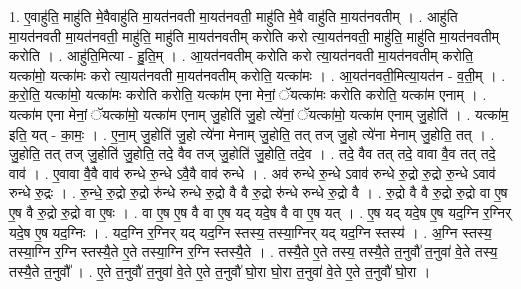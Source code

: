 \documentclass[17pt]{extarticle}
\begin{document}
1. ए॒वाहु॑ति॒ माहु॑ति मे॒वैवाहु॑ति मा॒यत॑नवती मा॒यत॑नवती॒ माहु॑ति मे॒वै वाहु॑ति मा॒यत॑नवतीम् । . आहु॑ति मा॒यत॑नवती मा॒यत॑नवती॒ माहु॑ति॒ माहु॑ति मा॒यत॑नवतीम् करोति करो त्या॒यत॑नवती॒ माहु॑ति॒ माहु॑ति मा॒यत॑नवतीम् करोति । . आहु॑ति॒मित्या - हु॒ति॒म् । . आ॒यत॑नवतीम् करोति करो त्या॒यत॑नवती मा॒यत॑नवतीम् करोति॒ यत्का॑मो॒ यत्का॑मः करो त्या॒यत॑नवती मा॒यत॑नवतीम् करोति॒ यत्का॑मः । . आ॒यत॑नवती॒मित्या॒यत॑न - व॒ती॒म् । . क॒रो॒ति॒ यत्का॑मो॒ यत्का॑मः करोति करोति॒ यत्का॑म एना मेनां॒ ॅयत्का॑मः करोति करोति॒ यत्का॑म एनाम् । . यत्का॑म एना मेनां॒ ॅयत्का॑मो॒ यत्का॑म एनाम् जु॒होति॑ जु॒हो त्ये॑नां॒ ॅयत्का॑मो॒ यत्का॑म एनाम् जु॒होति॑ । . यत्का॑म॒ इति॒ यत् - का॒मः॒ । . ए॒ना॒म् जु॒होति॑ जु॒हो त्ये॑ना मेनाम् जु॒होति॒ तत् तज् जु॒हो त्ये॑ना मेनाम् जु॒होति॒ तत् । . जु॒होति॒ तत् तज् जु॒होति॑ जु॒होति॒ तदे॒ वैव तज् जु॒होति॑ जु॒होति॒ तदे॒व । . तदे॒ वैव तत् तदे॒ वावा वै॒व तत् तदे॒ वाव॑ । . ए॒वावा वै॒वै वाव॑ रुन्धे रु॒न्धे ऽवै॒वै वाव॑ रुन्धे । . अव॑ रुन्धे रु॒न्धे ऽवाव॑ रुन्धे रु॒द्रो रु॒द्रो रु॒न्धे ऽवाव॑ रुन्धे रु॒द्रः । . रु॒न्धे॒ रु॒द्रो रु॒द्रो रु॑न्धे रुन्धे रु॒द्रो वै वै रु॒द्रो रु॑न्धे रुन्धे रु॒द्रो वै । . रु॒द्रो वै वै रु॒द्रो रु॒द्रो वा ए॒ष ए॒ष वै रु॒द्रो रु॒द्रो वा ए॒षः । . वा ए॒ष ए॒ष वै वा ए॒ष यद् यदे॒ष वै वा ए॒ष यत् । . ए॒ष यद् यदे॒ष ए॒ष यद॒ग्नि र॒ग्निर् यदे॒ष ए॒ष यद॒ग्निः । . यद॒ग्नि र॒ग्निर् यद् यद॒ग्नि स्तस्य॒ तस्या॒ग्निर् यद् यद॒ग्नि स्तस्य॑ । . अ॒ग्नि स्तस्य॒ तस्या॒ग्नि र॒ग्नि स्तस्यै॒ते ए॒ते तस्या॒ग्नि र॒ग्नि स्तस्यै॒ते । . तस्यै॒ते ए॒ते तस्य॒ तस्यै॒ते त॒नुवौ॑ त॒नुवा॑ वे॒ते तस्य॒ तस्यै॒ते त॒नुवौ᳚ । . ए॒ते त॒नुवौ॑ त॒नुवा॑ वे॒ते ए॒ते त॒नुवौ॑ घो॒रा घो॒रा त॒नुवा॑ वे॒ते ए॒ते त॒नुवौ॑ घो॒रा । \newline
\end{document}
